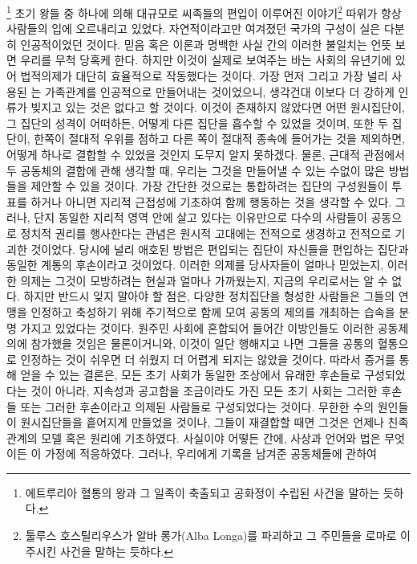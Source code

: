 \footnote{에트루리아 혈통의 왕과 그 일족이 축출되고 공화정이 수립된 사건을
말하는 듯하다.}
초기 왕들 중 하나에 의해 대규모로 씨족들의 편입이 이루어진 이야기\footnote{%
  툴루스 호스틸리우스가 알바 롱가(Alba Longa)를 파괴하고
  그 주민들을 로마로 이주시킨 사건을 말하는 듯하다.}
따위가 항상 사람들의 입에 오르내리고 있었다.
자연적이라고만 여겨졌던 국가의 구성이 실은 다분히 인공적이었던 것이다.
믿음 혹은 이론과 명백한 사실 간의 이러한 불일치는 언뜻 보면
우리를 무척 당혹케 한다.
하지만 이것이 실제로 보여주는 바는
사회의 유년기에 있어 법적의제가 대단히 효율적으로 작동했다는 것이다.
가장 먼저 그리고 가장 널리 사용된 는
가족관계를 인공적으로 만들어내는 것이었으니,
생각건대 이보다 더 강하게 인류가 빚지고 있는 것은 없다고 할 것이다.
이것이 존재하지 않았다면
어떤 원시집단이, 그 집단의 성격이 어떠하든,
어떻게 다른 집단을 흡수할 수 있었을 것이며,
또한 두 집단이,
한쪽이 절대적 우위를 점하고 다른 쪽이 절대적 종속에 들어가는 것을 제외하면,
어떻게 하나로 결합할 수 있었을 것인지
도무지 알지 못하겠다.
물론,
근대적 관점에서 두 공동체의 결합에 관해 생각할 때,
우리는 그것을 만들어낼 수 있는 수없이 많은 방법들을 제안할 수 있을 것이다.
가장 간단한 것으로는 통합하려는 집단의 구성원들이 투표를 하거나
아니면 지리적 근접성에 기초하여 함께 행동하는 것을 생각할 수 있다.
그러나,
단지 동일한 지리적 영역 안에 살고 있다는 이유만으로
다수의 사람들이 공동으로 정치적 권리를 행사한다는
관념은 원시적 고대에는 전적으로 생경하고 전적으로 기괴한 것이었다.
당시에 널리 애호된 방법은
편입되는 집단이 자신들을 편입하는 집단과 동일한 계통의 후손이라고
 것이었다.
이러한 의제를 당사자들이 얼마나 믿었는지,
이러한 의제는 그것이 모방하려는 현실과 얼마나 가까웠는지,
지금의 우리로서는 알 수 없다.
하지만 반드시 잊지 말아야 할 점은,
다양한 정치집단을 형성한 사람들은
그들의 연맹을 인정하고 축성하기 위해
주기적으로 함께 모여
공동의 제의를 개최하는 습속을
분명 가지고 있었다는 것이다.
원주민 사회에 혼합되어 들어간 이방인들도 이러한 공동제의에 참가했을
것임은 물론이거니와,
이것이 일단 행해지고 나면 그들을 공통의 혈통으로 인정하는 것이
쉬우면 더 쉬웠지 더 어렵게 되지는 않았을 것이다.
따라서 증거를 통해 얻을 수 있는 결론은,
모든 초기 사회가 동일한 조상에서 유래한 후손들로 구성되었다는 것이 아니라,
지속성과 공고함을 조금이라도 가진 모든 초기 사회는 그러한 후손들 또는
그러한 후손이라고 의제된 사람들로 구성되었다는 것이다.
무한한 수의 원인들이 원시집단들을 흩어지게 만들었을 것이나,
그들이 재결합할 때면 그것은 언제나 친족관계의 모델 혹은 원리에
기초하였다.
사실이야 어떻든 간에, 사상과 언어와 법은 무엇이든 이 가정에 적응하였다.
그러나,
우리에게 기록을 남겨준 공동체들에 관하여
